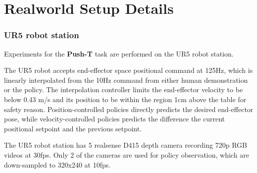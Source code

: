 


\section{Realworld Setup Details}

\subsubsection{UR5 robot station}
\label{sec:ur5_setup}
Experiments for the \textbf{Push-T} task are performed on the UR5 robot station. 

The UR5 robot accepts end-effector space positional command at 125Hz, which is linearly interpolated from the 10Hz command from either human demonstration or the policy. The interpolation controller limits the end-effector velocity to be below 0.43 m/s and its position to be within the region 1cm above the table for safety reason. Position-controlled policies directly predicts the desired end-effector pose, while velocity-controlled policies predicts the difference the current positional setpoint and the previous setpoint. 

The UR5 robot station has 5 realsense D415 depth camera recording 720p RGB videos at 30fps. Only 2 of the cameras are used for policy observation, which are down-sampled to 320x240 at 10fps.

